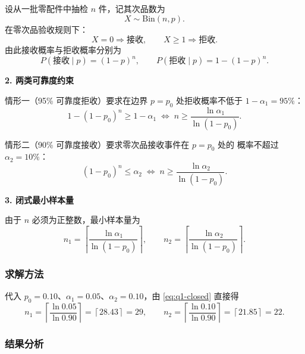 \documentclass[withoutpreface,bwprint]{cumcmthesis}
\begin{document}
设从一批零配件中抽检 $n$ 件，记其次品数为
\begin{equation}
    X \sim \mathrm{Bin}(n, p).
\end{equation}
在零次品验收规则下：
\begin{equation}
    X = 0 \Rightarrow \text{接收},\qquad
    X \geq 1 \Rightarrow \text{拒收}.
\end{equation}
由此接收概率与拒收概率分别为
\begin{equation}
    P(\text{接收} \mid p) = (1 - p)^n, \qquad
    P(\text{拒收} \mid p) = 1 - (1 - p)^n.
\end{equation}

\textbf{2. 两类可靠度约束}

情形一（95\% 可靠度拒收）要求在边界 $p = p_0$ 处拒收概率不低于
$1 - \alpha_1 = 95\%$：
\begin{equation}
    1 - (1 - p_0)^n \geq 1 - \alpha_1
    \;\Longleftrightarrow\;
    n \geq \frac{\ln \alpha_1}{\ln(1 - p_0)}.
\end{equation}

情形二（90\% 可靠度接收）要求零次品接收事件在 $p = p_0$ 处的
概率不超过 $\alpha_2 = 10\%$：
\begin{equation}
    (1 - p_0)^n \leq \alpha_2
    \;\Longleftrightarrow\;
    n \geq \frac{\ln \alpha_2}{\ln(1 - p_0)}.
\end{equation}

\textbf{3. 闭式最小样本量}

由于 $n$ 必须为正整数，最小样本量为
\begin{equation}
    n_1 = \left\lceil \frac{\ln \alpha_1}{\ln(1 - p_0)} \right\rceil, \qquad
    n_2 = \left\lceil \frac{\ln \alpha_2}{\ln(1 - p_0)} \right\rceil.
    \label{eq:q1-closed}
\end{equation}

\subsubsection{求解方法}

代入 $p_0 = 0.10$、$\alpha_1 = 0.05$、$\alpha_2 = 0.10$，由
\cref{eq:q1-closed} 直接得
\begin{equation}
    n_1 = \left\lceil \frac{\ln 0.05}{\ln 0.90} \right\rceil
        = \left\lceil 28.43 \right\rceil = 29, \qquad
    n_2 = \left\lceil \frac{\ln 0.10}{\ln 0.90} \right\rceil
        = \left\lceil 21.85 \right\rceil = 22.
\end{equation}

\subsubsection{结果分析}
\end{document}
